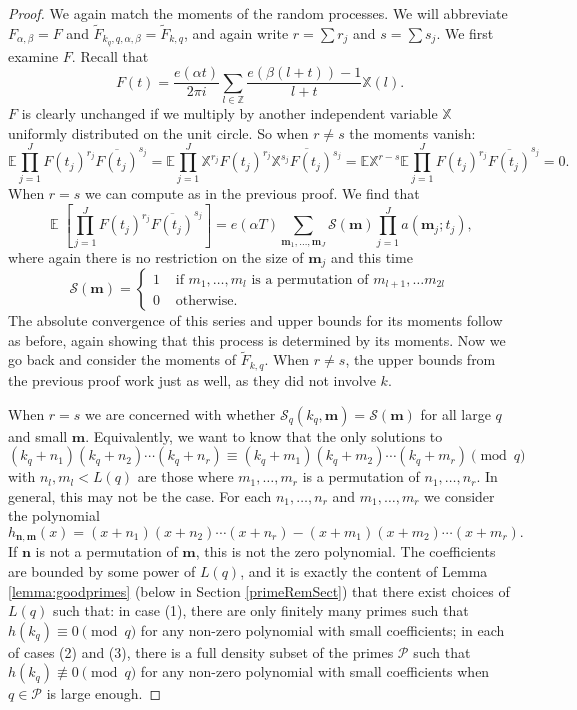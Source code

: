 \documentclass[12pt, a4paper]{amsart}
\theoremstyle{remark}
\newcommand{\Z}{\ensuremath{\mathbb{Z}}}
\newcommand{\bX}{\mathbb{X}}
\newcommand{\bm}{\mathbf{m}}
\newcommand{\bn}{\mathbf{n}}
\newcommand{\bE}{\mathbb{E}}
\newcommand{\cP}{\mathcal{P}}
\newcommand{\cS}{\mathcal{S}}
\DeclareMathOperator{\E}{\mathbb{E}}
\begin{document}
\begin{proof}
    We again match the moments of the random processes.
    We will abbreviate $F_{\alpha,\beta} = F$ and $\tilde F_{k_q, q,
    \alpha,\beta} = \tilde F_{k,q}$, and again write $r = \sum r_j$ and $s =
    \sum s_j$.
    We first examine $F$. Recall that
    \[
        F(t) = \frac{e(\alpha t)}{2\pi i}
        \sum_{l \in \Z}
        \frac{e(\beta(l + t)) - 1}
        {l + t}
        \bX(l).
    \]
    $F$ is clearly unchanged if we multiply by another independent variable
    $\bX$ uniformly distributed on the unit circle. So when $r \ne s$ the
    moments vanish:
    \[
        \bE \prod_{j=1}^J F(t_j)^{r_j} \overline{F(t_j)}^{s_j} = 
        \bE \prod_{j=1}^J \bX^{r_j} F(t_j)^{r_j} \overline{\bX^{s_j} F(t_j)^{s_j}}
        = \bE \bX^{r-s} 
        \bE \prod_{j=1}^J F(t_j)^{r_j} \overline{F(t_j)}^{s_j} = 0.
    \]
    When $r=s$ we can compute as in the previous proof.
    We find that
\[
\E \left[ \prod_{j=1}^J F(t_j)^{r_j} \overline{F(t_j)}^{s_j} \right] = 
    e(\alpha T)
 \sum_{\bm_1, \dots, \bm_J}\cS(\bm)
 \prod_{j=1}^J a(\bm_j; t_j)
 ,
\]
where again there is no restriction on the size of $\bm_j$ and
this time
\[
 \cS(\bm) =
 \left\{
 \begin{array}{ll}
     1 & \textrm{ if } 
     m_1, \ldots, m_l \textrm{ is a permutation of } m_{l+1}, \ldots m_{2l} \\
     0 & \textrm{ otherwise.}
 \end{array}
 \right.
\]
The absolute convergence of this series and upper bounds for its
moments follow as before, again showing that this process is determined
by its moments.
Now we go back and consider the moments of $\tilde F_{k, q}$.
When $r \ne s$, the upper bounds from the previous proof work just as well,
as they did not involve $k$.

When $r = s$ we are concerned with whether
$\cS_q(k_q, \bm) = \cS(\bm)$ for all large $q$ and small $\bm$.
Equivalently, we want to know that the only
solutions to
\[
    (k_q+n_1)(k_q+n_2)\cdots(k_q+n_r) \equiv (k_q+m_1)(k_q+m_2)\cdots(k_q+m_r) \pmod q
\]
with $n_l, m_l < L(q)$ are those where $m_1, \ldots, m_r$ is
a permutation of $n_1, \ldots, n_r$. In general, this may not be the case. For
each $n_1, \ldots, n_r$ and $m_1, \ldots, m_r$ we consider the polynomial
\[
    h_{\bn, \bm}(x) = (x+n_1)(x+n_2)\cdots(x+n_r) - (x+m_1)(x+m_2)\cdots(x+m_r).
\]
If $\bn$ is not a permutation of $\bm$, this is not the zero
polynomial. The coefficients are bounded by some power of $L(q)$,
and it is exactly the content of Lemma \ref{lemma:goodprimes} (below in Section \ref{primeRemSect}) that
there exist choices of $L(q)$ such that: in case
(1), there are only finitely many primes such that $h(k_q)\equiv 0\pmod q$ for
any non-zero polynomial with small coefficients; in each of cases (2) and (3),
there is a full
density subset of the primes $\cP$ such that $h(k_q)\not\equiv 0\pmod q$ for any
non-zero polynomial with small coefficients when $q\in\cP$ is large enough.
\end{proof}
\end{document}
